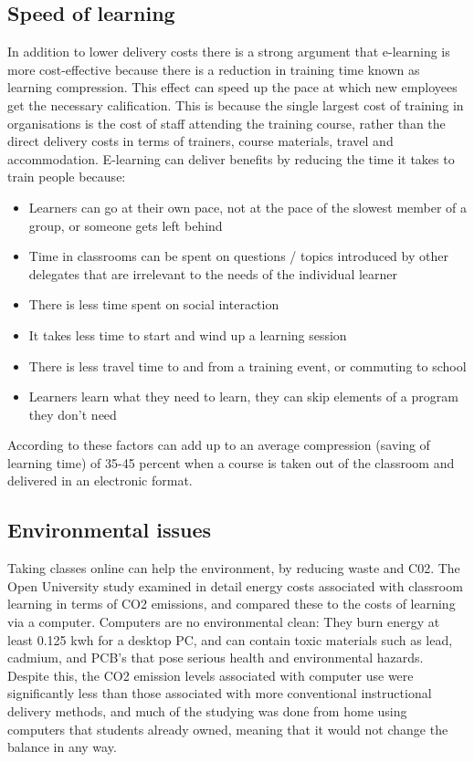 \subsection{Speed of learning}
In addition to lower delivery costs there is a
strong argument that e-learning is more cost-effective because there is a
reduction in training time known as learning compression. This effect can speed
up the pace at which new employees get the necessary calification. This is
because the single largest cost of training in organisations is the cost of
staff attending the training course, rather than the direct delivery costs in
terms of trainers, course materials, travel and accommodation. E-learning can
deliver benefits by reducing the time it takes to train people because:
\begin{itemize}
\item Learners can go at their own pace, not at the pace of the slowest member of a group, or someone gets left behind
\item Time in classrooms can be spent on questions / topics introduced by other delegates that are irrelevant to the needs of the individual learner
\item There is less time spent on social interaction
\item It takes less time to start and wind up a learning session
\item There is less travel time to and from a training event, or commuting to school
\item Learners learn what they need to learn, they can skip elements of a program they don’t need
\end{itemize}
According to \citet{brandonhall} these factors can add up to an average
compression (saving of learning time) of 35-45 percent when a course is taken
out of the classroom and delivered in an electronic format.

\subsection{Environmental issues}
Taking classes online can help the environment, by reducing waste and C02.  The
Open University study examined in detail energy costs associated with classroom
learning in terms of CO2 emissions, and compared these to the costs of learning
via a computer. Computers are no environmental clean: They burn energy at least
0.125 kwh for a desktop PC, and can contain toxic materials such as lead,
cadmium, and PCB’s that pose serious health and environmental hazards. Despite
this, the CO2 emission levels associated with computer use were significantly
less than those associated with more conventional instructional delivery
methods, and much of the studying was done from home using computers that
students already owned, meaning that it would not change the balance in any way.

